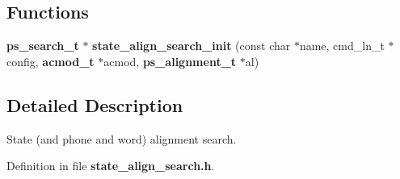 \subsection*{Functions}
\begin{DoxyCompactItemize}
\item 
{\bf ps\-\_\-search\-\_\-t} $\ast$ {\bfseries state\-\_\-align\-\_\-search\-\_\-init} (const char $\ast$name, cmd\-\_\-ln\-\_\-t $\ast$config, {\bf acmod\-\_\-t} $\ast$acmod, {\bf ps\-\_\-alignment\-\_\-t} $\ast$al)\label{state__align__search_8h_a037465636cb9d40dd1ebc1e04c0fd633}

\end{DoxyCompactItemize}


\subsection{Detailed Description}
State (and phone and word) alignment search. 

Definition in file {\bf state\-\_\-align\-\_\-search.\-h}.

